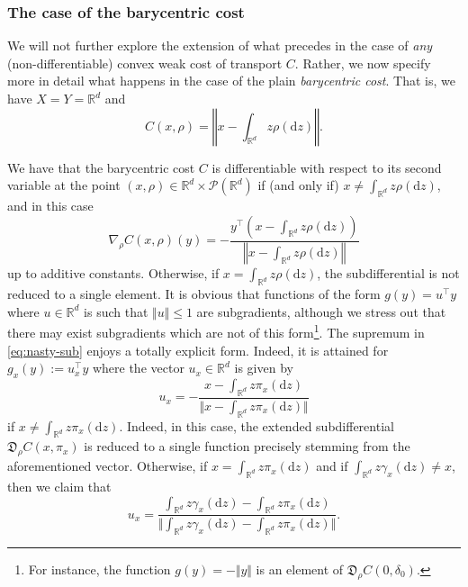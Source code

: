 \documentclass[leqno, 11pt, a4paper]{amsart}
\theoremstyle{definition}
\newcommand{\R}{\mathbb{R}}
\newcommand{\cP}{\mathcal{P}}
\newcommand{\dd}{\mathrm{d}}
\begin{document}
\subsubsection{The case of the barycentric cost}\label{sec:bar-cost}

We will not further explore the extension of what precedes in the case of \textit{any} (non-differentiable) convex weak cost of transport $C$. Rather, we now specify more in detail what happens in the case of the plain \textit{barycentric cost}. That is,  we have $X = Y = \R^d$ and $$C(x, \rho) = \left\Vert x - \int_{\R^d} z \rho(\dd z) \right\Vert.$$ 

 We have that the barycentric cost $C$ is differentiable with respect to its second variable at the point $(x, \rho) \in \R^d \times \cP(\R^d)$ if (and only if) $x \neq \int_{\R^d} z \rho(\dd z)$, and in this case $$\nabla_{\rho} C(x, \rho) (y)= -\frac{y^\top\left(x - \int_{\R^d} z \rho(\dd z)\right)}{\left\Vert x - \int_{\R^d} z \rho(\dd z)\right\Vert}$$ up to additive constants. Otherwise, if $x = \int_{\R^d} z \rho(\dd z)$, the subdifferential is not reduced to a single element. It is obvious that functions of the form $g(y) = u^\top y$ where $u \in \R^d$ is such that $\Vert u \Vert \leq 1$ are subgradients, although we stress out that there may exist subgradients which are not of this form\footnote{For instance, the function $g(y) = -\Vert y \Vert$ is an element of $\mathfrak{D}_\rho C(0, \delta_0)$.}.
    The supremum in \eqref{eq:nasty-sub} enjoys a totally explicit form. Indeed, it is attained for $g_x(y) := u_x^\top y$ where the vector $u_x \in \R^d$ is given by
    $$
        u_x = -\dfrac{x - \int_{\R^d} z \pi_x(\dd z)}{\Vert x - \int_{\R^d} z \pi_x(\dd z) \Vert}
    $$
    if $x \neq \int_{\R^d} z \pi_{x}(\dd z)$. Indeed, in this case, the extended subdifferential $\mathfrak{D}_\rho C(x, \pi_x)$ is reduced to a single function precisely stemming from the aforementioned vector. Otherwise, if $x = \int_{\R^d} z \pi_{x}(\dd z)$ and if $\int_{\R^d} z \gamma_x(\dd z) \neq x$, then we claim that 
    \begin{equation}\label{eq:u-x-second-case}
    u_x = \dfrac{\int_{\R^d} z \gamma_x(\dd z) - \int_{\R^d} z \pi_x(\dd z)}{\Vert \int_{\R^d} z \gamma_x(\dd z) - \int_{\R^d} z \pi_x(\dd z) \Vert}.
    \end{equation}
\end{document}
